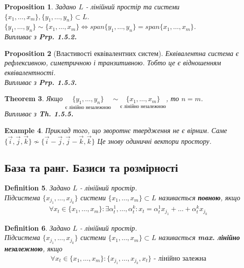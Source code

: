 \documentclass[a4paper, 10pt]{article}
\theoremstyle{theoremdd}
\newtheorem{theorem}{Theorem}[subsection]
\theoremstyle{theoremdd}
\newtheorem{definition}[theorem]{Definition}
\theoremstyle{theoremdd}
\theoremstyle{theoremdd}
\newtheorem{example}[theorem]{Example}
\theoremstyle{theoremdd}
\newtheorem{proposition}[theorem]{Proposition}
\theoremstyle{theoremdd}
\theoremstyle{theoremdd}
\theoremstyle{theoremdd}
\begin{document}
	\begin{proposition}
	Задано $L$ - лінійний простір та системи $\{x_1,\dots,x_m\}, \{y_1,\dots,y_n\} \subset L$.\\
	$\{y_1, \dots, y_n \} \sim \{x_1, \dots, x_m \} \iff span \{y_1, \dots, y_n\} = span \{x_1, \dots, x_m \}$.\\
	\textit{Випливає з} \textbf{Prp. 1.5.2.}
	\end{proposition}
	
	\begin{proposition}[Властивості еквівалентних систем]
	Еквівалентна система є рефлексивною, симетричною і транзитивною. Тобто це є відношенням еквівалентності.\\
	\textit{Випливає з} \textbf{Prp. 1.5.3.}
	\end{proposition}
	
	\begin{theorem}
	Якщо $\underset{\textrm{є лінійно незалежною}}{\{y_1, \dots, y_n \}} \sim \underset{\textrm{є лінійно незалежною}}{\{x_1, \dots, x_m \}} $, то $n = m$.\\
	\textit{Випливає з} \textbf{Th. 1.5.5.}
	\end{theorem}
	
	\begin{example}
	Приклад того, що зворотнє твердження не є вірним. Саме $\{\vec{i},\vec{j},\vec{k}\} \not\sim \{\vec{i}-\vec{j}, \vec{j}-\vec{k}, \vec{k} \}$ Це знову одиничні вектори простору.
	\end{example}
	
	\subsection{База та ранг. Базиси та розмірності}
	\begin{definition}
	Задано $L$ - лінійний простір.\\
	Підсистема $\{x_{j_1}, \dots, x_{j_k}\}$ системи $\{x_1, \dots, x_m\} \subset L$ називається \textbf{повною}, якщо
	\begin{align*}
	\forall x_t \in \{x_1, \dots, x_m\}: \exists \alpha^1_t, \dots, \alpha^k_t: x_t = \alpha^1_t x_{j_1} + \dots + \alpha^k_t x_{j_k}
	\end{align*}
	\end{definition}
	
	\begin{definition}
	Задано $L$ - лінійний простір.\\
	Підсистема $\{x_{j_1}, \dots, x_{j_k}\}$ системи $\{x_1, \dots, x_m\} \subset L$ називається \textbf{max. лінійно незалежною}, якщо
	\begin{align*}
	\forall x_t \in \{x_1, \dots, x_m\}: \{x_{j_1}, \dots, x_{j_k}, x_t\} \textrm{ - лінійно залежна}
	\end{align*}
	\end{definition}
	
\end{document}
